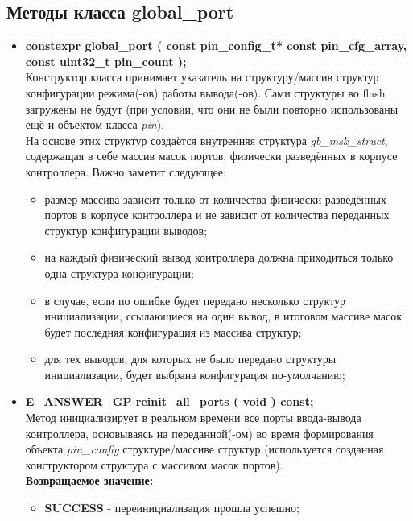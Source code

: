 \subsection{Методы класса global\_port}
\begin{itemize}
	\item \textbf{constexpr	global\_port	( const pin\_config\_t* const pin\_cfg\_array, const uint32\_t pin\_count );
	}\\Конструктор класса принимает указатель на структуру/массив структур конфигурации режима(-ов) работы  вывода(-ов). Сами структуры во flash загружены не будут (при условии, что они не были повторно использованы ещё и объектом класса \textit{pin}).\\На основе этих структур создаётся внутренняя структура \textit{gb\_msk\_struct}, содержащая в себе массив масок портов, физически разведённых в корпусе контроллера. Важно заметит следующее:
	\begin{itemize}
		\item размер массива зависит только от количества физически разведённых портов в корпусе контроллера и не зависит от количества переданных структур конфигурации выводов;
		\item на каждый физический вывод контроллера должна приходиться только одна структура конфигурации;
		\item в случае, если по ошибке будет передано несколько структур инициализации, ссылающиеся на один вывод, в итоговом массиве масок будет последняя конфигурация из массива структур;
		\item для тех выводов, для которых не было передано структуры инициализации, будет выбрана конфигурация по-умолчанию;
	\end{itemize}
	\item \textbf{E\_ANSWER\_GP	reinit\_all\_ports	( void ) const;}\\Метод инициализирует в реальном времени все порты ввода-вывода контроллера, основываясь на переданной(-ом) во время формирования объекта \textit{pin\_config} структуре/массиве структур (используется созданная конструктором структура с массивом масок портов).\\\textbf{Возвращаемое значение:}
	\begin{itemize}
		\item \textbf{SUCCESS} - переинициализация прошла успешно;

\end{itemize}
\end{itemize}
